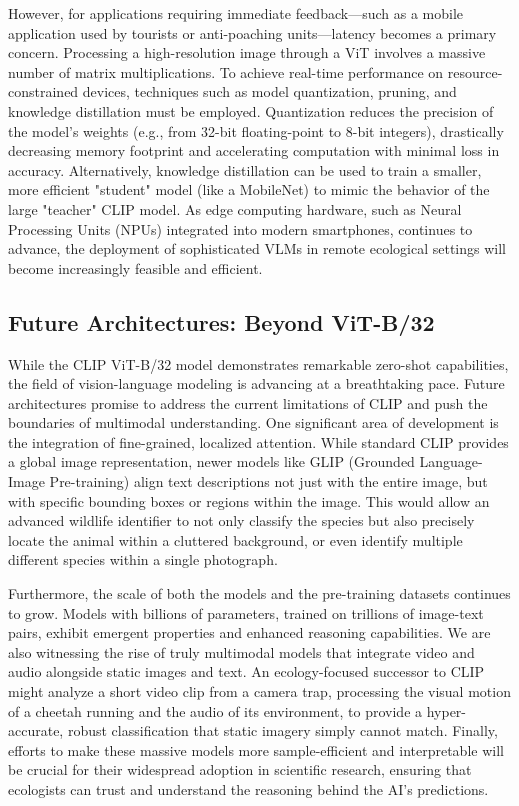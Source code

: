 \documentclass[11pt]{article}
\begin{document}
However, for applications requiring immediate feedback—such as a mobile application used by tourists or anti-poaching units—latency becomes a primary concern. Processing a high-resolution image through a ViT involves a massive number of matrix multiplications. To achieve real-time performance on resource-constrained devices, techniques such as model quantization, pruning, and knowledge distillation must be employed. Quantization reduces the precision of the model's weights (e.g., from 32-bit floating-point to 8-bit integers), drastically decreasing memory footprint and accelerating computation with minimal loss in accuracy. Alternatively, knowledge distillation can be used to train a smaller, more efficient "student" model (like a MobileNet) to mimic the behavior of the large "teacher" CLIP model. As edge computing hardware, such as Neural Processing Units (NPUs) integrated into modern smartphones, continues to advance, the deployment of sophisticated VLMs in remote ecological settings will become increasingly feasible and efficient.

\subsection{Future Architectures: Beyond ViT-B/32}
While the CLIP ViT-B/32 model demonstrates remarkable zero-shot capabilities, the field of vision-language modeling is advancing at a breathtaking pace. Future architectures promise to address the current limitations of CLIP and push the boundaries of multimodal understanding. One significant area of development is the integration of fine-grained, localized attention. While standard CLIP provides a global image representation, newer models like GLIP (Grounded Language-Image Pre-training) align text descriptions not just with the entire image, but with specific bounding boxes or regions within the image. This would allow an advanced wildlife identifier to not only classify the species but also precisely locate the animal within a cluttered background, or even identify multiple different species within a single photograph.

Furthermore, the scale of both the models and the pre-training datasets continues to grow. Models with billions of parameters, trained on trillions of image-text pairs, exhibit emergent properties and enhanced reasoning capabilities. We are also witnessing the rise of truly multimodal models that integrate video and audio alongside static images and text. An ecology-focused successor to CLIP might analyze a short video clip from a camera trap, processing the visual motion of a cheetah running and the audio of its environment, to provide a hyper-accurate, robust classification that static imagery simply cannot match. Finally, efforts to make these massive models more sample-efficient and interpretable will be crucial for their widespread adoption in scientific research, ensuring that ecologists can trust and understand the reasoning behind the AI's predictions.
\end{document}
